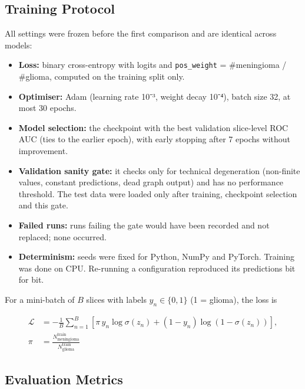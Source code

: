 \subsection{Training Protocol}

All settings were frozen before the first comparison and are identical across models:

\begin{itemize}
\item \textbf{Loss:} binary cross-entropy with logits and \texttt{pos\_weight} = \#meningioma / \#glioma, computed on the training split only.
\item \textbf{Optimiser:} Adam (learning rate 10⁻³, weight decay 10⁻⁴), batch size 32, at most 30 epochs.
\item \textbf{Model selection:} the checkpoint with the best validation slice-level ROC AUC (ties to the earlier epoch), with early stopping after 7 epochs without improvement.
\item \textbf{Validation sanity gate:} it checks only for technical degeneration (non-finite values, constant predictions, dead graph output) and has no performance threshold. The test data were loaded only after training, checkpoint selection and this gate.
\item \textbf{Failed runs:} runs failing the gate would have been recorded and not replaced; none occurred.
\item \textbf{Determinism:} seeds were fixed for Python, NumPy and PyTorch. Training was done on CPU. Re-running a configuration reproduced its predictions bit for bit.
\end{itemize}

For a mini-batch of $B$ slices with labels $y_n \in \{0,1\}$ (1 = glioma), the loss is

\begin{equation}
\begin{aligned}
\mathcal{L} &= -\frac{1}{B}\sum_{n=1}^{B}\left[\pi\, y_n \log\sigma(z_n) + (1-y_n)\log\left(1-\sigma(z_n)\right)\right], \\
\pi &= \frac{N^{\mathrm{train}}_{\mathrm{meningioma}}}{N^{\mathrm{train}}_{\mathrm{glioma}}}
\end{aligned}
\label{eq:7}
\end{equation}

\subsection{Evaluation Metrics}

